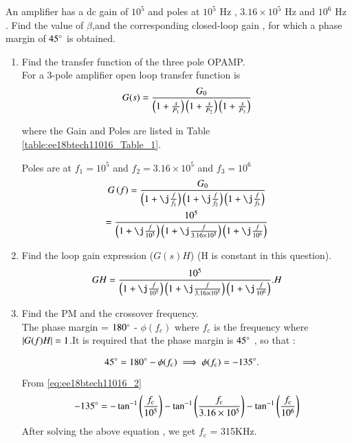 An amplifier has a dc gain of $10^5$ and poles at $10^5$ Hz , $3.16 \times 10^5$ Hz and $10^6$ Hz . Find the value of $\beta$,and the corresponding closed-loop gain , for which a phase margin of $45\degree$ is obtained. 

\begin{enumerate}[label=\arabic*.,ref=\theenumi]

\item Find the transfer function of the three pole OPAMP.
\\
\solution 
For a 3-pole amplifier open loop transfer function is 
\begin{align}
G(s) = \frac{G_0}{\left(1+\frac{s}{P_{1}}\right)\left(1+\frac{s}{P_{2}}\right)\left(1+\frac{s}{P_{3}}\right)}
\end{align}

where the Gain and Poles are listed in Table \ref{table:ee18btech11016_Table_1}.
%
\begin{table}[!ht]
\centering

\caption{}
\label{table:ee18btech11016_Table_1}
\end{table}

Poles are at $f_{1} =10^5$ and $f_{2} = 3.16\times10^{5}$ and $f_{3} = 10^6$ 
\begin{multline}
G\brak{f} = \frac{G_{0}}{\brak{1+\j\frac{f}{f_{1}}}\brak{1+\j\frac{f}{f_{2}}}\brak{1+\j\frac{f}{f_{3}}}}\\
= \frac{10^{5}}{\brak{1+\j\frac{f}{10^5}}\brak{1+\j\frac{f}{3.16\times10^{5}}}\brak{1+\j\frac{f}{10^6}}}
\label{eq:ee18btech11016_1}
\end{multline}
\item Find the loop gain expression ($G(s)H$) (H is constant in this question).
\\
\solution 
\begin{align}
GH = \frac{10^{5}}{\brak{1+\j\frac{f}{10^5}}\brak{1+\j\frac{f}{3.16\times10^{5}}}\brak{1+\j\frac{f}{10^6}}} . H
\label{eq:ee18btech11016_2}
\end{align}

\item Find the PM and the crossover frequency.
\\
\solution  
The phase margin = $180\degree$ - $\phi(f_{c})$ where $f_{c}$ is the frequency where $\left\vert G(f)H\right\vert=1$.It is required that the phase margin is $45\degree$ , so that :

\begin{align}
45\degree &=  180\degree - \phi(f_{c}) \implies \phi(f_{c})=-135\degree.
\end{align}
From \eqref{eq:ee18btech11016_2} 
\begin{align}
-135\degree = -\tan^{-1}\left(\frac{f_{c}}{10^5}\right)-\tan^{-1}\left(\frac{f_{c}}{3.16\times10^5}\right)-\tan^{-1}\left(\frac{f_{c}}{10^6}\right)
\end{align}
After solving the above equation , we get $f_{c}$ = 315KHz.
\\


\end{enumerate}
